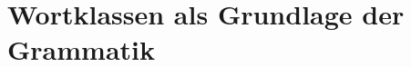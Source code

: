 \documentclass[handout,aspectratio=1610,dvipsnames]{beamer}
\begin{document}
  \section[Wortklassen]{Wortklassen als Grundlage der Grammatik}
  \let\woopsi\section\let\section\subsection\let\subsection\subsubsection
  
  \let\subsection\section\let\section\woopsi
  
\end{document}
